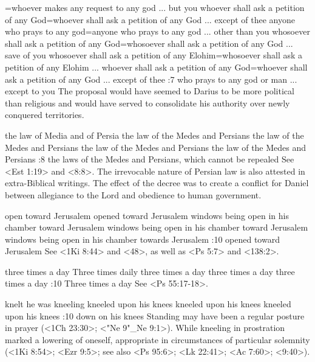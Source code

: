 ={whoever makes any request to any god ... but you} %
    {whoever shall ask a petition of any God}={whoever shall ask a petition of any God ... except of thee}  %
    {anyone who prays to any god}={anyone who prays to any god ... other than you}  %
    {whosoever shall ask a petition of any God}={whosoever shall ask a petition of any God ... save of you}  %
    {whosoever shall ask a petition of any Elohim}={whosoever shall ask a petition of any Elohim ... }  %
    {whoever shall ask a petition of any God}={whoever shall ask a petition of any God ... except of thee}  %
:7 {who prays to any god or man ... except to you} The proposal would have seemed 
to Darius to be more political than religious and would have served 
to consolidate his authority over newly conquered territories.

    {the law of Media and of Persia} %
    {the law of the Medes and Persians} %
    {the law of the Medes and Persians} %
    {the law of the Medes and Persians} %
    {the law of the Medes and Persians} %
:8 {the laws of the Medes and Persians, which cannot be repealed} See <Est 1:19> and <8:8>. The
irrevocable nature of Persian  law is also attested in extra-Biblical writings. The effect of the
decree was to create a conflict for Daniel between allegiance to the  Lord and obedience to human government.

    {open toward Jerusalem} %
    {opened toward Jerusalem} %
    {windows being open in his chamber toward Jerusalem} %
    {windows being open in his chamber toward Jerusalem} %
    {windows being open in his chamber towards Jerusalem} %
:10 {opened toward Jerusalem} See <1Ki 8:44> and <48>, as well as <Ps 5:7> and <138:2>.

    {three times a day} %
    {Three times daily} %
    {three times a day} %
    {three times a day} %
    {three times a day} %
:10 {Three times a day} See <Ps 55:17-18>.

    {knelt} %
    {he was kneeling} %
    {kneeled upon his knees} %
    {kneeled upon his knees} %
    {kneeled upon his knees} %
:10 {down on his knees} Standing may have been a regular posture in 
prayer (<1Ch 23:30>; <"Ne 9"_Ne 9:1>). While kneeling in prostration marked a lowering of oneself, appropriate in
circumstances of particular  solemnity (<1Ki 8:54>; <Ezr 9:5>; see also <Ps 95:6>; <Lk 22:41>; <Ac 7:60>; 
<9:40>).

